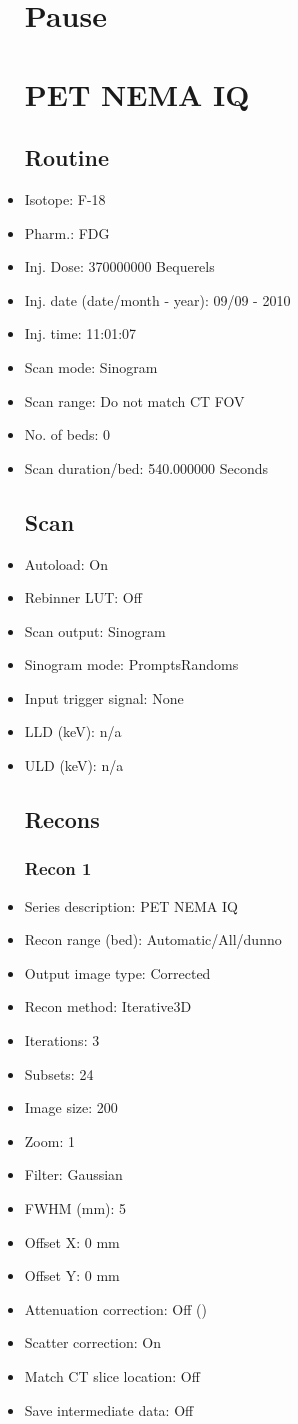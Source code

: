 \documentclass[12pt]{article}
\begin{document}
\begin{itemize}
\section{Pause}
\section{PET NEMA IQ}\subsection{Routine}
\item Isotope: F-18
\item Pharm.: FDG
\item Inj. Dose: 370000000 Bequerels
\item Inj. date (date/month - year): 09/09 - 2010
\item Inj. time: 11:01:07
\item Scan mode: Sinogram
\item Scan range: Do not match CT FOV
\item No. of beds: 0
\item Scan duration/bed: 540.000000 Seconds
\subsection{Scan}
\item Autoload: On
\item Rebinner LUT: Off
\item Scan output: Sinogram
\item Sinogram mode: PromptsRandoms
\item Input trigger signal: None
\item LLD (keV): n/a
\item ULD (keV): n/a
\subsection{Recons}
\subsubsection{Recon 1}
\item Series description: PET NEMA IQ
\item Recon range (bed): Automatic/All/dunno
\item Output image type: Corrected
\item Recon method: Iterative3D
\item Iterations: 3
\item Subsets: 24
\item Image size: 200
\item Zoom: 1
\item Filter: Gaussian
\item FWHM (mm): 5
\item Offset X: 0 mm
\item Offset Y: 0 mm
\item Attenuation correction: Off ()
\item Scatter correction: On
\item Match CT slice location: Off
\item Save intermediate data: Off
\end{itemize}
\end{document}
